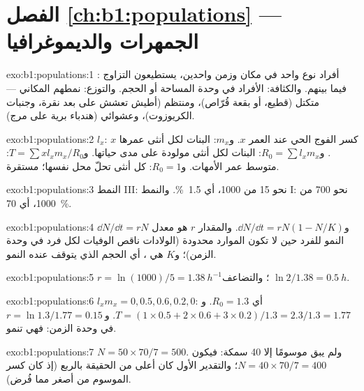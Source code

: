 \section*{الفصل \ref{ch:b1:populations} --- الجمهرات والديموغرافيا}

\begin{solution}{exo:b1:populations:1}
: أفراد نوع واحد في مكان وزمن واحدين، يستطيعون التزاوج فيما
بينهم. والكثافة: الأفراد في وحدة المساحة أو الحجم. والتوزع: نمطهم
المكاني --- متكتل (قطيع، أو بقعة قُرّاص)، ومنتظم (أطيش تعشش على بعد
نقرة، وجنبات الكريوزوت)، وعشوائي (هندباء برية على مرج).
\end{solution}

\begin{solution}{exo:b1:populations:2}
$l_x$: كسر الفوج الحي عند العمر $x$. و$m_x$: البنات لكل
أنثى عمرها $x$. و$R_0 = \sum l_x m_x$: البنات لكل أنثى مولودة
على مدى حياتها. و$T = \sum x l_x m_x / R_0$: متوسط عمر الأمهات.
و$R_0 = 1$: كل أنثى تحلّ محل نفسها؛  مستقرة.
\end{solution}

\begin{solution}{exo:b1:populations:3}
النمط III: نحو 15 من 1000، أي \qty{1.5}{\%}. والنمط I: نحو 700 من
1000، أي \qty{70}{\%}.
\end{solution}

\begin{solution}{exo:b1:populations:4}
$\dd N/\dd t = rN$ و$\dd N/\dd t = rN(1 - N/K)$. والمقدار $r$ هو
معدل النمو للفرد حين لا تكون الموارد محدودة (الولادات ناقص
الوفيات لكل فرد في وحدة الزمن)؛ و$K$ هي ، أي
الحجم الذي يتوقف عنده النمو.
\end{solution}

\begin{solution}{exo:b1:populations:5}
$r = \ln(1000)/5 = \qty{1.38}{h^{-1}}$؛ والتضاعف $\ln 2/1.38 =
\qty{0.5}{h}$.
\end{solution}

\begin{solution}{exo:b1:populations:6}
$l_x m_x = 0, 0.5, 0.6, 0.2, 0$: أي $R_0 = 1.3$. و$T = (1\times 0.5 +
2\times 0.6 + 3\times 0.2)/1.3 = 2.3/1.3 = 1.77$. و$r = \ln 1.3/1.77 =
\qty{0.15}{}$ في وحدة الزمن: فهي تنمو.
\end{solution}

\begin{solution}{exo:b1:populations:7}
$N = 50\times 70/7 = 500$. ولم يبق موسومًا إلا 40 سمكة: فيكون $N = 40\times
70/7 = 400$؛ والتقدير الأول كان أعلى من الحقيقة بالربع (إذ كان كسر
الموسوم من  أصغر مما فُرض).
\end{solution}


